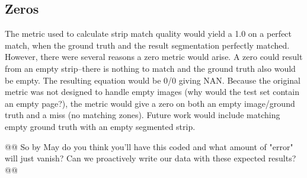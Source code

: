 \documentclass[conference]{IEEEtran}
\begin{document}
\subsection{Zeros}

The metric used to calculate strip match quality would yield a 1.0 on a perfect
match, when the ground truth and the result segmentation perfectly matched. However, there
were several reasons a zero metric would arise. A zero could result from an
empty strip--there is nothing to match and the ground truth also would be
empty. The resulting equation would be 0/0 giving NAN. Because the original
metric was not designed to handle empty images (why would the test set contain
an empty page?), the metric would give a zero on both an empty image/ground
truth and a miss (no matching zones). Future work would include matching empty
ground truth with an empty segmented strip.

@@ So by May do you think you'll have this coded and what amount of "error"
will just vanish? Can we proactively write our data with these expected
results? @@

%
%
\end{document}
